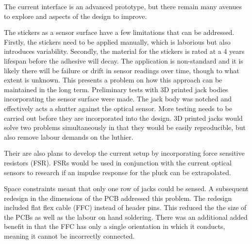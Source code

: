 The current interface is an advanced prototype, but there remain many avenues to explore and aspects of the design to improve.

The stickers as a sensor surface have a few limitations that can be addressed. Firstly, the stickers need to be applied manually, which is laborious but also introduces variability. Secondly, the material for the stickers is rated at a 4 years lifespan before the adhesive will decay. The application is non-standard and it is likely there will be failure or drift in sensor readings over time, though to what extent is unknown. This presents a problem on how this approach can be maintained in the long term. Preliminary tests with 3D printed jack bodies incorporating the sensor surface were made. The jack body was notched and effectively acts a shutter against the optical sensor. More testing needs to be carried out before they are incorporated into the design. 3D printed jacks would solve two problems simultaneously in that they would be easily reproducible, but also remove labour demands on the luthier.

Their are also plans to develop the current setup by incorporating force sensitive resistors (FSR). 
FSRs would be used in conjunction with the current optical sensors to research if an impulse response for the pluck can be extrapolated.



Space constraints meant that only one row of jacks could be sensed. A subsequent redesign in the dimensions of the PCB addressed this problem.
The redesign included flat flex cable (FFC) instead of header pins. This reduced the the size of the PCBs as well as the labour on hand soldering.
There was an additional added benefit in that the FFC has only a single orientation in which it conducts, meaning it cannot be incorrectly connected.


